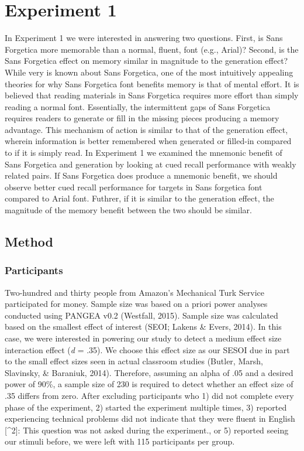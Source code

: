 \documentclass[english,pdf]{apa6}
\begin{document}
\hypertarget{experiment-1}{%
\section{Experiment 1}\label{experiment-1}}

In Experiment 1 we were interested in answering two questions. First, is Sans Forgetica more memorable than a normal, fluent, font (e.g., Arial)? Second, is the Sans Forgetica effect on memory similar in magnitude to the generation effect? While very is known about Sans Forgetica, one of the most intuitively appealing theories for why Sans Forgetica font benefits memory is that of mental effort. It is believed that reading materials in Sans Forgetica requires more effort than simply reading a normal font. Essentially, the intermittent gaps of Sans Forgetica requires readers to generate or fill in the missing pieces producing a memory advantage. This mechanism of action is similar to that of the generation effect, wherein information is better remembered when generated or filled-in compared to if it is simply read. In Experiment 1 we examined the mnemonic benefit of Sans Forgetica and generation by looking at cued recall performance with weakly related pairs. If Sans Forgetica does produce a mnemonic benefit, we should observe better cued recall performance for targets in Sans forgetica font compared to Arial font. Futhrer, if it is similar to the generation effect, the magnitude of the memory benefit between the two should be similar.

\hypertarget{method}{%
\subsection{Method}\label{method}}

\hypertarget{participants}{%
\subsubsection{Participants}\label{participants}}

Two-hundred and thirty people from Amazon's Mechanical Turk Service participated for money. Sample size was based on a priori power analyses conducted using PANGEA v0.2 (Westfall, 2015). Sample size was calculated based on the smallest effect of interest (SEOI; Lakens \& Evers, 2014). In this case, we were interested in powering our study to detect a medium effect size interaction effect (\emph{d} = .35). We choose this effect size as our SESOI due in part to the small effect sizes seen in actual classroom studies (Butler, Marsh, Slavinsky, \& Baraniuk, 2014). Therefore, assuming an alpha of .05 and a desired power of 90\%, a sample size of 230 is required to detect whether an effect size of .35 differs from zero. After excluding participants who 1) did not complete every phase of the experiment, 2) started the experiment multiple times, 3) reported experiencing technical problems did not indicate that they were fluent in English {[}\^{}2{]}: This question was not asked during the experiment., or 5) reported seeing our stimuli before, we were left with 115 participants per group.
\end{document}
